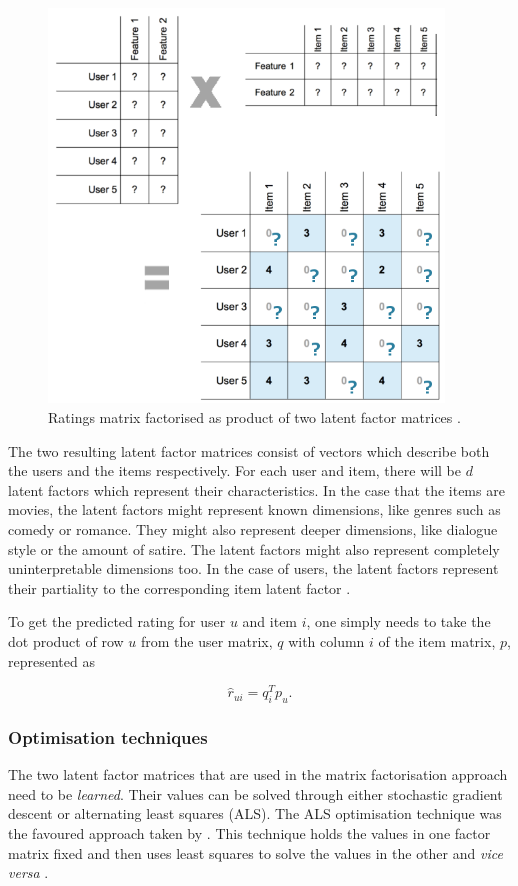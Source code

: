 \begin{figure}[H]
\centering
\includegraphics[width=10.5cm]{Figures/2_4_matrix_factorization.png}
\decoRule
\caption[Factor-matrices]{Ratings matrix factorised as product of two latent factor matrices \parencite{bailey_2016}.}
\label{fig:factors}
\end{figure}

The two resulting latent factor matrices consist of vectors which describe both the users and the items respectively. For each user and item, there will be $d$ latent factors which represent their characteristics. In the case that the items are movies, the latent factors might represent known dimensions, like genres such as comedy or romance. They might also represent deeper dimensions, like dialogue style or the amount of satire. The latent factors might also represent completely uninterpretable dimensions too. In the case of users, the latent factors represent their partiality to the corresponding item latent factor \parencite{koren2009matrix}.

To get the predicted rating for user $u$ and item $i$, one simply needs to take the dot product of row $u$ from the user matrix, $q$ with column $i$ of the item matrix, $p$, represented as

\begin{equation}
    \hat{r}_{ui} = q_i^T p_u.
\label{eqn:dot_prod}
\end{equation}

\subsubsection{Optimisation techniques}
The two latent factor matrices that are used in the matrix factorisation approach need to be \textit{learned}. Their values can be solved through either stochastic gradient descent or alternating least squares (ALS). The ALS optimisation technique was the favoured approach taken by \cite{bellkor_2008}. This technique holds the values in one factor matrix fixed and then uses least squares to solve the values in the other and \textit{vice versa} \parencite{koren2009matrix}.

